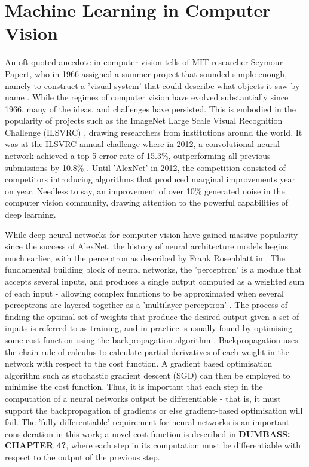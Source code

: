 \section{Machine Learning in Computer Vision}


An oft-quoted anecdote in computer vision tells of MIT researcher Seymour Papert, who in 1966 assigned a summer project that sounded simple enough, namely to construct a 'visual system' that could describe what objects it saw by name \cite{papert1966vision}. While the regimes of computer vision have evolved substantially since 1966, many of the ideas, and challenges have persisted. This is embodied in the popularity of projects such as the ImageNet Large Scale Visual Recognition Challenge (ILSVRC) \cite{ilsvrc}, drawing researchers from institutions around the world. It was at the ILSVRC annual challenge where in 2012, a convolutional neural network achieved a top-5 error rate of 15.3\%, outperforming all previous submissions by 10.8\% \cite{krizhevsky2012alexnet}. Until 'AlexNet' in 2012, the competition consisted of competitors introducing algorithms that produced marginal improvements year on year. Needless to say, an improvement of over 10\% generated noise in the computer vision community, drawing attention to the powerful capabilities of deep learning.

While deep neural networks for computer vision have gained massive popularity since the success of AlexNet, the history of neural architecture models begins much earlier, with the perceptron as described by Frank Rosenblatt in \cite{rosenblatt1959neurodynamics}. The fundamental building block of neural networks, the 'perceptron' is a module that accepts several inputs, and produces a single output computed as a weighted sum of each input - allowing complex functions to be approximated when several perceptrons are layered together as a 'multilayer perceptron' \cite{minsky1969perceptrons}. The process of finding the optimal set of weights that produce the desired output given a set of inputs is referred to as training, and in practice is usually found by optimising some cost function using the backpropagation algorithm \cite{rumelhart1986backprop}. Backpropagation uses the chain rule of calculus to calculate partial derivatives of each weight in the network with respect to the cost function. A gradient based optimisation algorithm such as stochastic gradient descent (SGD) can then be employed to minimise the cost function. Thus, it is important that each step in the computation of a neural networks output be differentiable - that is, it must support the backpropagation of gradients or else gradient-based optimisation will fail. The 'fully-differentiable' requirement for neural networks is an important consideration in this work; a novel cost function is described in \textbf{DUMBASS: CHAPTER 4?}, where each step in its computation must be differentiable with respect to the output of the previous step. 

